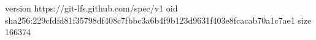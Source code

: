 version https://git-lfs.github.com/spec/v1
oid sha256:229cfdfd81f35798df408c7fbbc3a6b4f9b123d9631f403e8fcacab70a1c7ae1
size 166374
